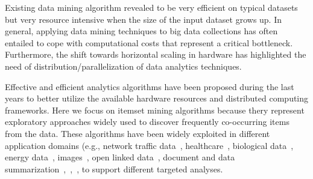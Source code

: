 Existing data mining algorithm revealed to be very efficient on typical datasets but
very resource intensive when the size of the input dataset grows up. In general,
applying data mining techniques to big data collections has often entailed to
cope with computational costs that represent a critical bottleneck. Furthermore,
the shift towards horizontal scaling in hardware has highlighted the need of
distribution/parallelization of data analytics techniques. 

Effective and efficient analytics algorithms have been proposed during the last
years to better utilize the available hardware resources and distributed
computing frameworks. Here we focus on itemset mining algorithms because thery
represent exploratory approaches widely used to discover frequently co-occurring
items from the data. These algorithms have been widely exploited in different
application domains (e.g., network traffic data~\cite{ApilettiBCCG13},
healthcare~\cite{META-TIST-2015}, biological data~\cite{DBLP:conf/sigmod/CongXPTY04}, energy
data~\cite{NostroENDM2016_senzacrossref}, images~\cite{zaianeimage},  open
linked data~\cite{BCOpenLinkedData}, document and data summarization~\cite{BaralisCFG15},~\cite{DBLP:journals/cg/LopesPPM07},~\cite{Mampaey:2011:TMI:2020408.2020499},
to support different targeted analyses.

